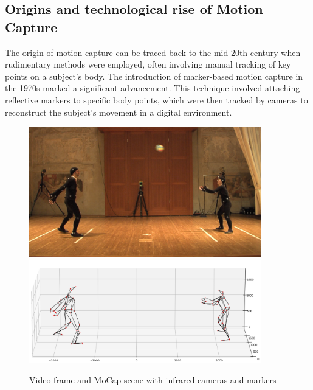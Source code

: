 \subsection{Origins and technological rise of Motion Capture}
The origin of motion capture can be traced back to the mid-20th century when rudimentary methods were employed, 
often involving manual tracking of key points on a subject's body. 
The introduction of marker-based motion capture in the 1970s marked a significant advancement. 
This technique involved attaching reflective markers to specific body points, 
which were then tracked by cameras to reconstruct the subject's movement in a digital environment. 
\begin{figure}[H]
    \centering
    \includegraphics[width=0.9\textwidth]{graphics/bodyMarkersExampleImage.png}
    \includegraphics[width=0.9\textwidth]{graphics/bodyMarkersExampleMoCap.png}
    \caption{Video frame and MoCap scene with infrared cameras and markers}
    \label{fig:common}
\end{figure}

